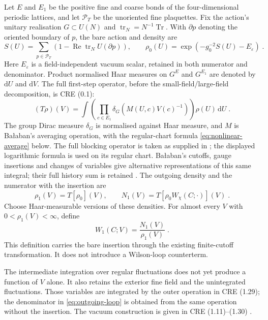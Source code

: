 \documentclass[11pt]{article}
\newcommand{\dd}{\mathrm{d}}
\newcommand{\tr}{\operatorname{tr}}
\begin{document}
Let $E$ and $E_1$ be the positive fine and coarse bonds of the four-dimensional periodic lattices, and let $\mathcal P_T$ be the unoriented fine plaquettes. Fix the action's unitary realisation $G\subset U(N)$ and $\tr_N=N^{-1}\operatorname{Tr}$. With $\partial p$ denoting the oriented boundary of $p$, the bare action and density are
\begin{equation}\label{eq:bare-action}
    S(U)=\sum_{p\in \mathcal P_T}
        (1-\operatorname{Re}\tr_N U(\partial p)),
    \qquad \rho_0(U)=\exp(-g_0^{-2}S(U)-E_\varepsilon)\;.
\end{equation}
Here $E_\varepsilon$ is a field-independent vacuum scalar, retained in both numerator and denominator. Product normalised Haar measures on $G^E$ and $G^{E_1}$ are denoted by $\dd U$ and $\dd V$. The full first-step operator, before the small-field/large-field decomposition, is CRE (0.1):
\begin{equation}\label{eq:bare-blocking-operator}
    (T\rho)(V)=\int
        \left(\prod_{c\in E_1}\delta_G(M(U,c)V(c)^{-1})\right)
        \rho(U)\,\dd U\;.
\end{equation}
The group Dirac measure $\delta_G$ is normalised against Haar measure, and $M$ is Ba{\l}aban's averaging operation, with the regular-chart formula \eqref{eq:nonlinear-average} below. The full blocking operator is taken as supplied in \cite[(0.1)]{BalabanCRE}; the displayed logarithmic formula is used on its regular chart. Ba{\l}aban's cutoffs, gauge insertions and changes of variables give alternative representations of this same integral; their full history sum is retained \cite{BalabanCRE}. The outgoing density and the numerator with the insertion are
\begin{equation}\label{eq:first-step}
    \rho_1(V)=T[\rho_0](V),
    \qquad N_1(V)=T[\rho_0 W_\chi(C;\cdot)](V)\;.
\end{equation}
Choose Haar-measurable versions of these densities. For almost every $V$ with $0<\rho_1(V)<\infty$, define
\begin{equation}\label{eq:outgoing-loop}
    W_1(C;V)=\frac{N_1(V)}{\rho_1(V)}\;.
\end{equation}
This definition carries the bare insertion through the existing finite-cutoff transformation. It does not introduce a Wilson-loop counterterm.

The intermediate integration over regular fluctuations does not yet produce a function of $V$ alone. It also retains the exterior fine field and the unintegrated fluctuations. Those variables are integrated by the outer operation in CRE (1.29); the denominator in \eqref{eq:outgoing-loop} is obtained from the same operation without the insertion. The vacuum construction is given in CRE (1.11)--(1.30) \cite{BalabanCRE}.
\end{document}
